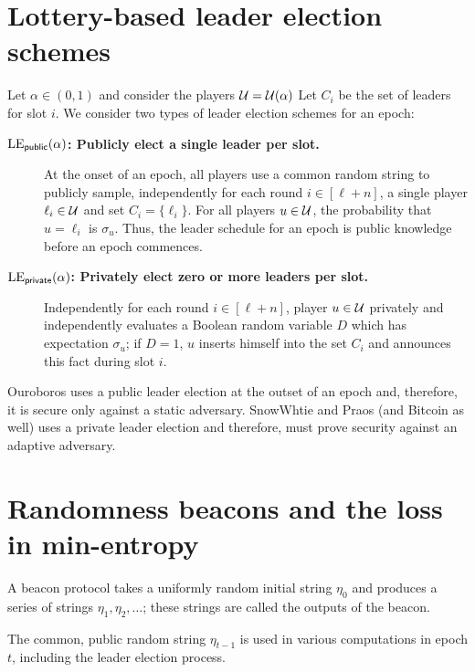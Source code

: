 \section{Lottery-based leader election schemes}\label{sec:leader-election-public-private}
Let $\alpha \in (0,1)$ and consider the players $\mathcal{U} = \mathcal{U}(\alpha)$
Let $C_i$ be the set of leaders for slot $i$. 
We consider two types of leader election schemes for an epoch: 
\begin{description}
    \item[\textbf{$\mathrm{LE}_\mathsf{public}(\alpha)$: Publicly elect a single leader per slot.}] \label{lottery:public}
    At the onset of an epoch, 
    all players use a common random string to 
    publicly sample, 
    independently for each round $i \in [\ell + n]$, 
    a single player $\ell_i \in \mathcal{U}$ and  
    set $C_i = \{\ell_i\}$. 
    For all players $u \in \mathcal{U}$, 
    the probability that $u = \ell_i$ is $\sigma_u$. 
    Thus, the leader schedule for an epoch 
    is public knowledge before an epoch commences. 

    \item[\textbf{$\mathrm{LE}_\mathsf{private}(\alpha)$: Privately elect zero or more leaders per slot.}] \label{lottery:private}
    Independently for each round $i \in [\ell + n]$, 
    player $u \in \mathcal{U}$ 
    privately and independently 
    evaluates a Boolean random variable $D$
    which has expectation $\sigma_u$; 
    if $D = 1$, $u$ 
    inserts himself into the set $C_i$ 
    and announces this fact during slot $i$. 
\end{description}
\noindent
Ouroboros uses a public leader election 
at the outset of an epoch 
and, therefore, it is secure only against a static adversary. 
SnowWhtie and Praos (and Bitcoin as well) uses a private leader election 
and therefore, must prove security against an adaptive adversary. 




\section{Randomness beacons and the loss in min-entropy}
A beacon protocol takes a uniformly random initial string $\eta_0$ 
and produces a series of strings $\eta_1, \eta_2, \ldots$; 
these strings are called the outputs of the beacon.


The common, public random string $\eta_{t-1}$ 
is used in various computations in epoch $t$, 
including the leader election process.

